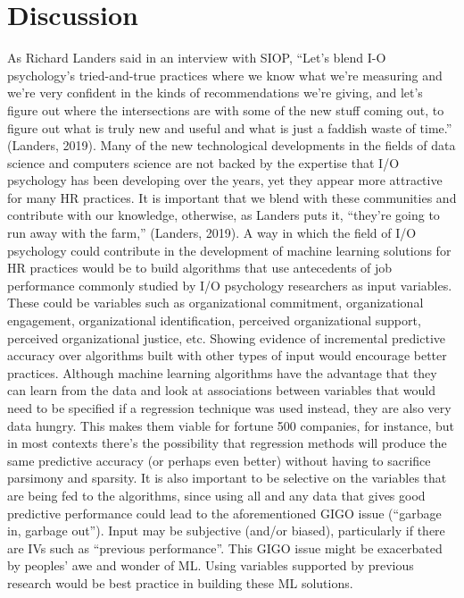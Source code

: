 \documentclass[
  man]{apa7}
\begin{document}
\hypertarget{discussion}{%
\section{Discussion}\label{discussion}}

As Richard Landers said in an interview with SIOP, ``Let's blend I-O psychology's tried-and-true practices where we know what we're measuring and we're very confident in the kinds of recommendations we're giving, and let's figure out where the intersections are with some of the new stuff coming out, to figure out what is truly new and useful and what is just a faddish waste of time.'' (Landers, 2019).
Many of the new technological developments in the fields of data science and computers science are not backed by the expertise that I/O psychology has been developing over the years, yet they appear more attractive for many HR practices.
It is important that we blend with these communities and contribute with our knowledge, otherwise, as Landers puts it, ``they're going to run away with the farm,'' (Landers, 2019).
A way in which the field of I/O psychology could contribute in the development of machine learning solutions for HR practices would be to build algorithms that use antecedents of job performance commonly studied by I/O psychology researchers as input variables.
These could be variables such as organizational commitment, organizational engagement, organizational identification, perceived organizational support, perceived organizational justice, etc.
Showing evidence of incremental predictive accuracy over algorithms built with other types of input would encourage better practices.
Although machine learning algorithms have the advantage that they can learn from the data and look at associations between variables that would need to be specified if a regression technique was used instead, they are also very data hungry.
This makes them viable for fortune 500 companies, for instance, but in most contexts there's the possibility that regression methods will produce the same predictive accuracy (or perhaps even better) without having to sacrifice parsimony and sparsity.
It is also important to be selective on the variables that are being fed to the algorithms, since using all and any data that gives good predictive performance could lead to the aforementioned GIGO issue (``garbage in, garbage out'').
Input may be subjective (and/or biased), particularly if there are IVs such as ``previous performance''.
This GIGO issue might be exacerbated by peoples' awe and wonder of ML.
Using variables supported by previous research would be best practice in building these ML solutions.
\end{document}
